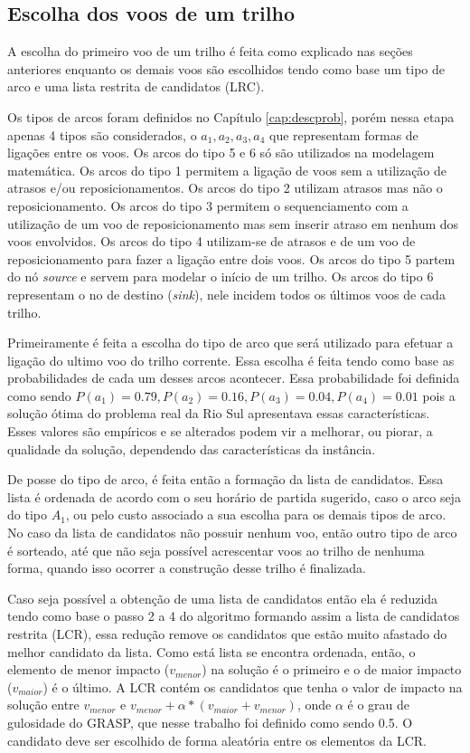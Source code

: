   
\subsection{Escolha dos voos de um trilho}

A escolha do primeiro voo de um trilho é feita como explicado nas seções
anteriores enquanto os demais voos são escolhidos tendo como base um tipo de
arco e uma lista restrita de candidatos (LRC).
 
Os tipos de arcos foram definidos no Capítulo \ref{cap:descprob}, porém nessa
etapa apenas 4 tipos são considerados, o   $a_{1},a_{2},a_{3},a_{4}$ que
representam formas de ligações entre os voos. Os arcos do tipo 5 e 6 só são
utilizados na modelagem matemática. Os arcos do tipo 1 permitem a
ligação de voos sem a utilização de atrasos e/ou reposicionamentos. Os arcos do
tipo 2 utilizam atrasos mas não o reposicionamento. Os arcos do tipo 3 permitem
o sequenciamento com a utilização de um voo de reposicionamento mas sem inserir
atraso em nenhum dos voos envolvidos. Os arcos do tipo 4 utilizam-se de atrasos
e de um voo de reposicionamento para fazer a ligação entre dois voos. Os arcos
do tipo 5 partem do nó \textit{source} e servem para modelar o início de um
trilho. Os arcos do tipo 6 representam o no de destino (\textit{sink}), nele
incidem todos os últimos voos de cada trilho.

Primeiramente é feita a escolha do tipo de arco que será utilizado para efetuar
a ligação do ultimo voo do trilho corrente. Essa escolha é feita tendo
como base as probabilidades de cada um desses arcos acontecer. Essa
probabilidade foi definida como sendo
$P(a_{1})=0.79,P(a_{2})=0.16,P(a_{3})=0.04,P(a_{4})=0.01$ pois a solução ótima
do problema real da Rio Sul apresentava essas características. Esses valores
são empíricos e se alterados podem vir a melhorar, ou piorar, a qualidade da
solução, dependendo das características da instância.

De posse do tipo de arco, é feita então a formação da lista de candidatos. Essa
lista é ordenada de acordo com o seu horário de partida sugerido, caso o arco
seja do tipo $A_{1}$, ou pelo custo associado a sua escolha para os demais
tipos de arco. No caso da lista de candidatos não possuir nenhum voo, então
outro tipo de arco é sorteado, até que não seja possível acrescentar voos ao
trilho de nenhuma forma, quando isso ocorrer a construção
desse trilho é finalizada.
 
Caso seja possível a obtenção de uma lista de candidatos então ela é reduzida
tendo como base o passo 2 a 4 do algoritmo  formando
assim a lista de candidatos restrita (LCR), essa redução remove os candidatos que estão
muito afastado do melhor candidato da lista. Como está lista se encontra
ordenada, então, o elemento de menor impacto ($v_{menor}$) na solução é o
primeiro e o de maior impacto ($v_{maior}$) é o último. A LCR contém os
candidatos que tenha o valor de impacto na solução entre $v_{menor}$
e $v_{menor} + \alpha*(v_{maior} + v_{menor})$, onde $\alpha$ é o
grau de gulosidade do GRASP, que nesse trabalho foi definido como sendo 0.5. O
candidato deve ser escolhido de forma aleatória entre os elementos da LCR.

